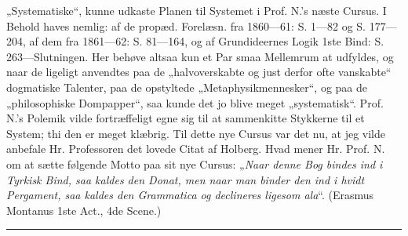 \documentclass[12pt,a4paper]{book}
\begin{document}
„Systematiske“, kunne udkaste Planen til Systemet i Prof. N.'s næste Cursus.
I Behold haves nemlig: af de propæd. Forelæsn. fra 1860---61: S. 1---82 og
S. 177---204, af dem fra 1861---62: S. 81---164, og af Grundideernes Logik 1ste
Bind: S. 263---Slutningen. Her behøve altsaa kun et Par smaa Mellemrum at
udfyldes, og naar de ligeligt anvendtes paa de „halvoverskabte og just derfor
ofte vanskabte“ dogmatiske Talenter, paa de opstyltede „Metaphysikmennesker“, og
paa de „philosophiske Dompapper“, saa kunde det jo blive meget „systematisk“.
Prof. N.'s Polemik vilde fortræffeligt egne sig til at sammenkitte Stykkerne til
et System; thi den er meget klæbrig. Til dette nye Cursus var det nu, at jeg
vilde anbefale Hr. Professoren det lovede Citat af Holberg. Hvad mener Hr.
Prof. N. om at sætte følgende Motto paa sit nye Cursus: „\emph{Naar denne Bog
bindes ind i Tyrkisk Bind, saa kaldes den \textit{Donat}, men naar man binder
den ind i hvidt Pergament, saa kaldes den \textit{Grammatica} og declineres
ligesom \textit{ala}}“. (Erasmus Montanus 1ste Act., 4de Scene.)

\begin{center}\rule{2cm}{0.4pt}\end{center}
\end{document}

